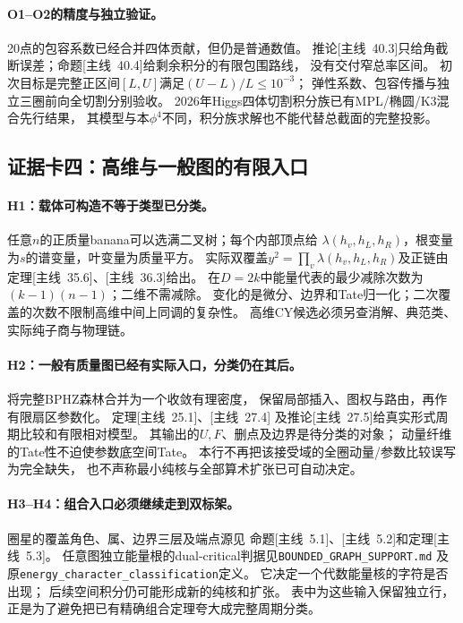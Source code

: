 \documentclass[11pt,a4paper]{ctexart}
\theoremstyle{cnplain}\newtheorem{theorem}{定理}[section]
\theoremstyle{definition}\newtheorem{definition}[theorem]{定义}
\theoremstyle{remark}\newtheorem{remark}[theorem]{注}
\begin{document}
\paragraph{O1--O2的精度与独立验证。}
20点的包容系数已经合并四体贡献，但仍是普通数值。
推论\textup{[主线~40.3]}只给角截断误差；命题\textup{[主线~40.4]}给剩余积分的有限包围路线，
没有交付窄总率区间。
初次目标是完整正区间$[L,U]$满足$(U-L)/L\le10^{-3}$；
弹性系数、包容传播与独立三圈前向全切割分别验收。
2026年Higgs四体切割积分族已有MPL/椭圆/K3混合先行结果\cite{LitWWW}，
其模型与本$\phi^4$不同，积分族求解也不能代替总截面的完整投影。

\subsection{证据卡四：高维与一般图的有限入口}
\label{subsec:classopen}
\paragraph{H1：载体可构造不等于类型已分类。}
任意$n$的正质量banana可以选满二叉树；每个内部顶点给
$\lambda(h_v,h_L,h_R)$，根变量为$s$的谱变量，叶变量为质量平方。
实际双覆盖$y^2=\prod_v\lambda(h_v,h_L,h_R)$及正链由
定理\textup{[主线~35.6]}、\textup{[主线~36.3]}给出。
在$D=2k$中能量代表的最少减除次数为$(k-1)(n-1)$；二维不需减除。
变化的是微分、边界和Tate归一化；二次覆盖的次数不限制高维中间上同调的复杂性。
高维CY候选必须另查消解、典范类、实际纯子商与物理链。

\paragraph{H2：一般有质量图已经有实际入口，分类仍在其后。}
将完整BPHZ森林合并为一个收敛有理密度，
保留局部插入、图权与路由，再作有限扇区参数化。
定理\textup{[主线~25.1]}、\textup{[主线~27.4]}
及推论\textup{[主线~27.5]}给真实形式周期比较和有限相对模型。
其输出的$U,F$、删点及边界是待分类的对象；
动量纤维的Tate性不迫使参数底空间Tate。
本行不再把该接受域的全圈动量/参数比较误写为完全缺失，
也不声称最小纯核与全部算术扩张已可自动决定。

\paragraph{H3--H4：组合入口必须继续走到双标架。}
圈星的覆盖角色、属、边界三层及端点源见
命题\textup{[主线~5.1]}、\textup{[主线~5.2]}和定理\textup{[主线~5.3]}。
任意图独立能量根的dual-critical判据见\texttt{BOUNDED\_GRAPH\_SUPPORT.md}
及原\texttt{energy\_character\_classification}定义。
它决定一个代数能量核的字符是否出现；
后续空间积分仍可能形成新的纯核和扩张。
表中为这些输入保留独立行，正是为了避免把已有精确组合定理夸大成完整周期分类。
\end{document}
